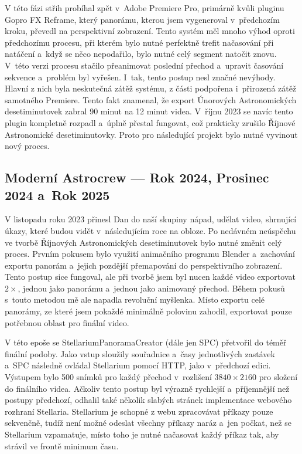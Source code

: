 \documentclass[12pt,a4paper,titlepage]{article}
\begin{document}
V této fázi střih probíhal zpět v~Adobe Premiere Pro, primárně kvůli pluginu Gopro FX Reframe, který panorámu, kterou jsem vygeneroval v~předchozím kroku, převedl na perspektivní zobrazení. Tento systém měl mnoho výhod oproti předchozímu procesu, při kterém bylo nutné perfektně trefit načasování při natáčení a~když se něco nepodařilo, bylo nutné celý segment natočit znovu. V~této verzi procesu stačilo přeanimovat poslední přechod a~upravit časování sekvence a~problém byl vyřešen. I~tak, tento postup nesl značné nevýhody. Hlavní z nich byla neskutečná zátěž systému, z části podpořena i~přirozená zátěž samotného Premiere. Tento fakt znamenal, že export Únorových Astronomických desetiminutovek zabral 90 minut na 12 minut videa. V~říjnu 2023 se navíc tento plugin kompletně rozpadl a~úplně přestal fungovat, což prakticky zrušilo Říjnové Astronomické desetiminutovky. Proto pro následující projekt bylo nutné vyvinout nový proces. 
\subsection{Moderní Astrocrew --- Rok 2024, Prosinec 2024 a~Rok 2025}
V listopadu roku 2023 přinesl Dan do naší skupiny nápad, udělat video, shrnující úkazy, které budou vidět v~následujícím roce na obloze. Po nedávném neúspěchu ve tvorbě Říjnových Astronomických desetiminutovek bylo nutné změnit celý proces. Prvním pokusem bylo využití animačního programu Blender a~zachování exportu panorám a~jejich pozdější přemapování do perspektivního zobrazení. Tento postup sice fungoval, ale při tvorbě jsem byl nucen každé video exportovat \(2\times \), jednou jako panorámu a~jednou jako animovaný přechod. Během pokusů s~touto metodou mě ale napadla revoluční myšlenka. Místo exportu celé panorámy, ze které jsem pokaždé minimálně polovinu zahodil, exportovat pouze potřebnou oblast pro finální video. 

V této epoše se StellariumPanoramaCreator (dále jen SPC) přetvořil do téměř finální podoby. Jako vstup sloužily souřadnice a~časy jednotlivých zastávek a~SPC následně ovládal Stellarium pomocí HTTP, jako v~předchozí edici. Výstupem bylo 500 snímků pro každý přechod v~rozlišení \(3840\times2160\) pro složení do finálního videa. Ačkoliv tento postup byl výrazně rychlejší a~příjemnější než postupy předchozí, odhalil také několik slabých stránek implementace webového rozhraní Stellaria. Stellarium je schopné z webu zpracovávat příkazy pouze sekvenčně, tudíž není možné odeslat všechny příkazy naráz a~jen počkat, než se Stellarium vzpamatuje, místo toho je nutné načasovat každý příkaz tak, aby strávil ve frontě minimum času.
\end{document}
